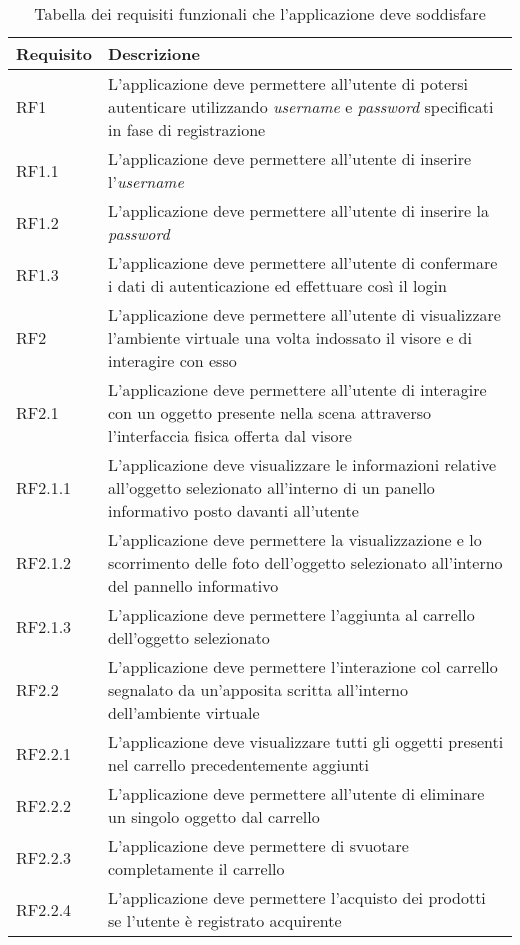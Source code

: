 \begin{table}
	\centering
	\label{my-label}
	\begin{tabular}{| l | p{10cm} |}
		\hline
		Requisito & Descrizione \\ \hline
		RF1 & L'applicazione deve permettere all'utente di potersi autenticare utilizzando \textit{username} e \textit{password} specificati in fase di registrazione \\ \hline
		RF1.1 & L'applicazione deve permettere all'utente di inserire l'\textit{username} \\ \hline
		RF1.2 & L'applicazione deve permettere all'utente di inserire la \textit{password} \\ \hline
		RF1.3 & L'applicazione deve permettere all'utente di confermare i dati di autenticazione ed effettuare così il login \\ \hline
		RF2 & L'applicazione deve permettere all'utente di visualizzare l'ambiente virtuale una volta indossato il visore e di interagire con esso \\ \hline
		RF2.1 & L'applicazione deve permettere all'utente di interagire con un oggetto presente nella scena attraverso l'interfaccia fisica offerta dal visore \\ \hline
		RF2.1.1 & L'applicazione deve visualizzare le informazioni relative all'oggetto selezionato all'interno di un panello informativo posto davanti all'utente \\ \hline
		RF2.1.2 & L'applicazione deve permettere la visualizzazione e lo scorrimento delle foto dell'oggetto selezionato all'interno del pannello informativo \\ \hline
		RF2.1.3 & L'applicazione deve permettere l'aggiunta al carrello dell'oggetto selezionato \\ \hline
		RF2.2 & L'applicazione deve permettere l'interazione col carrello segnalato da un'apposita scritta all'interno dell'ambiente virtuale \\ \hline
		RF2.2.1 & L'applicazione deve visualizzare tutti gli oggetti presenti nel carrello precedentemente aggiunti \\ \hline
		RF2.2.2 & L'applicazione deve permettere all'utente di eliminare un singolo oggetto dal carrello \\ \hline
		RF2.2.3 & L'applicazione deve permettere di svuotare completamente il carrello \\ \hline
		RF2.2.4 & L'applicazione deve permettere l'acquisto dei prodotti se l'utente è registrato acquirente \\ 
		\hline
	\end{tabular}
	\caption{Tabella dei requisiti funzionali che l'applicazione deve soddisfare}
\end{table}
\FloatBarrier

